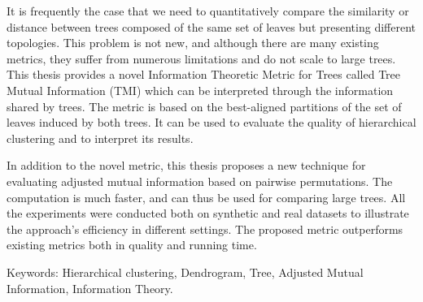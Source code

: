 \small

It is frequently the case that we need to quantitatively compare the similarity or distance between trees composed of the same set of leaves but presenting different topologies. This problem is not new, and although there are many existing metrics, they suffer from numerous limitations and do not scale to large trees. This thesis provides a novel Information Theoretic Metric for Trees called Tree Mutual Information (TMI) which can be interpreted through the information shared by trees. The metric is based on the best-aligned partitions of the set of leaves induced by both trees. It can be used to evaluate the quality of hierarchical clustering and to interpret its results.

In addition to the novel metric, this thesis proposes a new technique for evaluating adjusted mutual information based on pairwise permutations. The computation is much faster, and can thus be used for comparing large trees. All the experiments were conducted both on synthetic and real datasets to illustrate the approach's efficiency in different settings. The proposed metric outperforms existing metrics both in quality and running time. 

Keywords: Hierarchical clustering, Dendrogram, Tree, Adjusted Mutual Information, Information Theory.